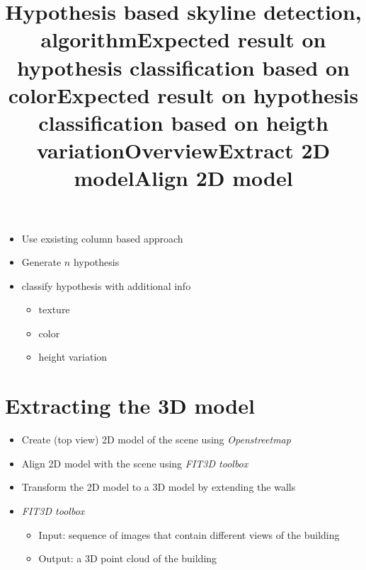 \title{Hypothesis based skyline detection, algorithm}
\begin{itemize}
\item Use exsisting column based approach
\item Generate $n$ hypothesis
\item classify hypothesis with additional info
	\begin{itemize}
	\item texture 
	\item color
	\item height variation 
	\end{itemize}
\end{itemize}

\title{Expected result on hypothesis classification based on color}

\title{Expected result on hypothesis classification based on heigth variation}



%


\section{Extracting the 3D model}
\title{Overview}
\begin{itemize}
\item Create (top view) 2D model of the scene using \emph{Openstreetmap}
\item Align 2D model with the scene using \emph{FIT3D toolbox}
\item Transform the 2D model to a 3D model by extending the walls
\end{itemize}

\title{Extract 2D model}

\title{Align 2D model}
\begin{itemize}
\item \emph{FIT3D toolbox}
	\begin{itemize}
	\item Input: sequence of images that contain different views of the building
	\item Output: a 3D point cloud of the building
	\end{itemize}
\end{itemize}


